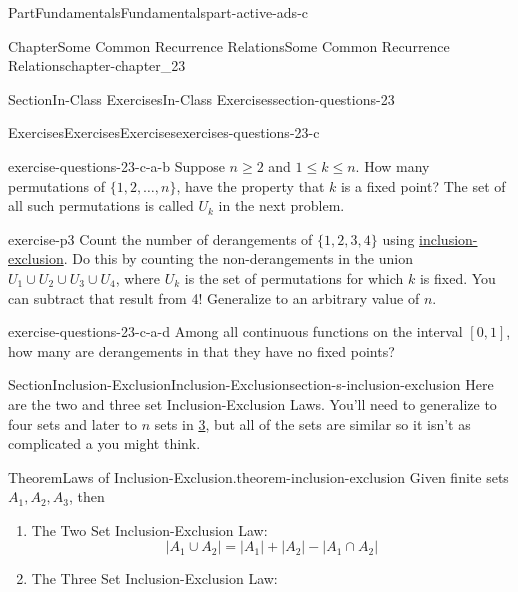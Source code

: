 \documentclass[oneside,10pt,]{book}
\numberwithin{equation}{section}
\begin{document}
\begin{partptx}{Part}{Fundamentals}{}{Fundamentals}{}{}{part-active-ads-c}
\begin{chapterptx}{Chapter}{Some Common Recurrence Relations}{}{Some Common Recurrence Relations}{}{}{chapter-chapter_23}
\begin{sectionptx}{Section}{In-Class Exercises}{}{In-Class Exercises}{}{}{section-questions-23}
\begin{exercises-subsection-numberless}{Exercises}{Exercises}{}{Exercises}{}{}{exercises-questions-23-c}
\begin{exercisegroup}
\begin{divisionexerciseeg}{2}{}{}{exercise-questions-23-c-a-b}%
Suppose \(n \geq 2\) and \(1 \leq k \leq n\).  How many permutations of \(\{1,2, \dots ,n\}\),  have the property that \(k\) is a fixed point?  The set of all such permutations is called \(U_k\) in the next problem.%
\end{divisionexerciseeg}%
\begin{divisionexerciseeg}{3}{}{}{exercise-p3}%
Count the number of derangements of \(\{1,2,3,4\}\) using \hyperref[section-s-inclusion-exclusion]{inclusion-exclusion}. Do this by counting the non-derangements in the union \(U_1 \cup U_2 \cup U_3 \cup U_4\), where \(U_k\) is the set of permutations for which \(k\) is fixed. You can subtract that result from 4!   Generalize to an arbitrary value of \(n\).%
\end{divisionexerciseeg}%
\begin{divisionexerciseeg}{4}{}{}{exercise-questions-23-c-a-d}%
Among all continuous functions on the interval \([0,1]\), how many are derangements in that they have no fixed points?%
\end{divisionexerciseeg}%
\end{exercisegroup}
\par\medskip\noindent
\end{exercises-subsection-numberless}
\end{sectionptx}
%
%
\typeout{************************************************}
\typeout{************************************************}
%
\begin{sectionptx}{Section}{Inclusion-Exclusion}{}{Inclusion-Exclusion}{}{}{section-s-inclusion-exclusion}
Here are the two and three set Inclusion-Exclusion Laws. You'll need to generalize to four sets and later to \(n\) sets in \hyperlink{exercise-p3}{3}, but all of the sets are similar so it isn't as complicated a you might think.%
\begin{theorem}{Theorem}{Laws of Inclusion-Exclusion.}{}{theorem-inclusion-exclusion}%
%
Given finite sets \(A_1, A_2, A_3\), then%
\begin{enumerate}[label=(\alph*)]
\item\hypertarget{li-ie2}{}The Two Set Inclusion-Exclusion Law:%
\begin{equation*}
\lvert A_1 \cup A_2 \rvert =\lvert A_1 \rvert + \lvert A_2 \rvert - \lvert A_1 \cap A_2 \rvert  
\end{equation*}
%
\item\hypertarget{li-ie3}{}The Three Set Inclusion-Exclusion Law:%

\end{enumerate}
\end{theorem}
\end{sectionptx}
\end{chapterptx}
\end{partptx}
\end{document}
